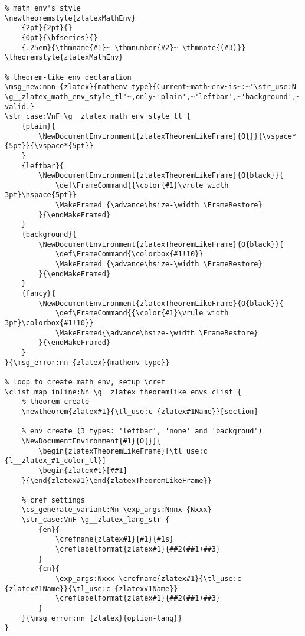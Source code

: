 \begin{verbatim}
% math env's style
\newtheoremstyle{zlatexMathEnv}
    {2pt}{2pt}{}
    {0pt}{\bfseries}{}
    {.25em}{\thmname{#1}~ \thmnumber{#2}~ \thmnote{(#3)}}
\theoremstyle{zlatexMathEnv}

% theorem-like env declaration
\msg_new:nnn {zlatex}{mathenv-type}{Current~math~env~is~:~'\str_use:N \g__zlatex_math_env_style_tl'~,only~'plain',~'leftbar',~'background',~'fancy'~types~are-valid.}
\str_case:VnF \g__zlatex_math_env_style_tl {
    {plain}{
        \NewDocumentEnvironment{zlatexTheoremLikeFrame}{O{}}{\vspace*{5pt}}{\vspace*{5pt}}
    }
    {leftbar}{
        \NewDocumentEnvironment{zlatexTheoremLikeFrame}{O{black}}{
            \def\FrameCommand{{\color{#1}\vrule width 3pt}\hspace{5pt}}
            \MakeFramed {\advance\hsize-\width \FrameRestore}
        }{\endMakeFramed}
    }
    {background}{
        \NewDocumentEnvironment{zlatexTheoremLikeFrame}{O{black}}{
            \def\FrameCommand{\colorbox{#1!10}}
            \MakeFramed {\advance\hsize-\width \FrameRestore}
        }{\endMakeFramed}
    }
    {fancy}{
        \NewDocumentEnvironment{zlatexTheoremLikeFrame}{O{black}}{
            \def\FrameCommand{{\color{#1}\vrule width 3pt}\colorbox{#1!10}}
            \MakeFramed{\advance\hsize-\width \FrameRestore}
        }{\endMakeFramed}
    }
}{\msg_error:nn {zlatex}{mathenv-type}}

% loop to create math env, setup \cref
\clist_map_inline:Nn \g__zlatex_theoremlike_envs_clist {
    % theorem create
    \newtheorem{zlatex#1}{\tl_use:c {zlatex#1Name}}[section]

    % env create (3 types: 'leftbar', 'none' and 'backgroud')
    \NewDocumentEnvironment{#1}{O{}}{
        \begin{zlatexTheoremLikeFrame}[\tl_use:c {l__zlatex_#1_color_tl}]
        \begin{zlatex#1}[##1]
    }{\end{zlatex#1}\end{zlatexTheoremLikeFrame}}

    % cref settings
    \cs_generate_variant:Nn \exp_args:Nnnx {Nxxx}
    \str_case:VnF \g__zlatex_lang_str {
        {en}{
            \crefname{zlatex#1}{#1}{#1s}
            \creflabelformat{zlatex#1}{##2(##1)##3}
        }
        {cn}{
            \exp_args:Nxxx \crefname{zlatex#1}{\tl_use:c {zlatex#1Name}}{\tl_use:c {zlatex#1Name}}
            \creflabelformat{zlatex#1}{##2(##1)##3}
        }
    }{\msg_error:nn {zlatex}{option-lang}}
}


\end{verbatim}
